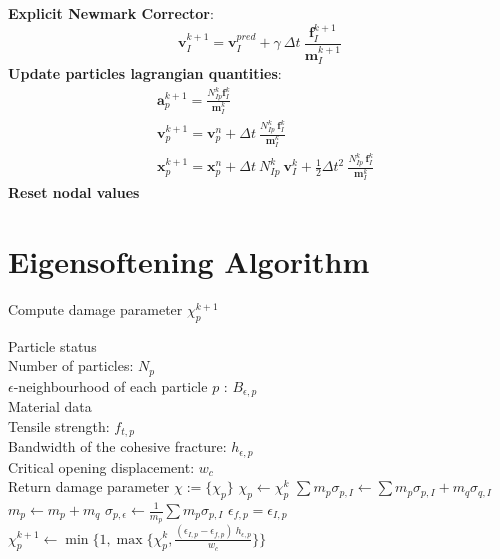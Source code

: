 \message{ !name(2020_EFM_MPM_Eigensoftening.tex)}\documentclass[preprint,12pt,a4paper]{elsarticle}
\newcommand{\vec}[1]{
  \ensuremath{\mathbf{{#1}}}
}
\newcommand{\tens}[1]{
  \ensuremath{\mathbf{{#1}}}
}
\begin{document}
\begin{algorithm}
\begin{algorithmic}[1]
    \STATE \textbf{Explicit Newmark Corrector}:\\
    \begin{equation*}
      \vec{v}_{I}^{k+1} = \vec{v}_{I}^{pred} + \gamma\ \Delta t\ \frac{\vec{f}_{I}^{k+1}}{\tens{m}_I^{k+1}}  
    \end{equation*}
    \STATE \textbf{Update particles lagrangian quantities}:
    \begin{align*}
      &\vec{a}_p^{k+1} = \frac{N_{Ip}^k\vec{f}_{I}^{k}}{\tens{m}_I^k}\\
      &\vec{v}_p^{k+1} = \vec{v}_p^n + \Delta t\
        \frac{N_{Ip}^k\
        \vec{f}_{I}^{k}}{\tens{m}_I^k}\\
      &\vec{x}_p^{k+1} = \vec{x}_p^n + \Delta t\
         N_{Ip}^k\ \vec{v}_{I}^{k} +
        \frac{1}{2}\Delta t^2\ \frac{N_{Ip}^k\
        \vec{f}_{I}^{k}}{\tens{m}_I^k}
    \end{align*}
    \STATE \textbf{Reset nodal values}
  \end{algorithmic}
\end{algorithm} 


\section{Eigensoftening Algorithm}
\label{sec:eigens-algor-1}

\begin{algorithm}
  \caption{Compute damage parameter $\chi_p^{k+1}$}
  \label{alg-eigens}
  \begin{algorithmic}
    \Require Particle status\\
    Number of particles: $N_p$\\
    $\epsilon$-neighbourhood of each particle $p$ : $B_{\epsilon,p}$\\
    \Require Material data\\
    Tensile strength: $f_{t,p}$\\
    Bandwidth of the cohesive fracture: $h_{\epsilon,p}$ \\
    Critical opening displacement: $w_c$\\ 
    \Ensure Return damage parameter $\chi := \{\chi_p\}$
    \State $\chi_p \leftarrow \chi_p^{k}$
    \For{$p$ to $N_p$}
    \For{$q \in B_{\epsilon,p}$}
    \If{$\chi_q < 1$}    
    \State $\sum m_p\sigma_{p,I} \leftarrow \sum m_p\sigma_{p,I} + m_q\sigma_{q,I}$
    \EndIf    
    \State $m_p \leftarrow m_p + m_q$
    \EndFor
    \State $\sigma_{p,\epsilon} \leftarrow \frac{1}{m_p} \sum m_p\sigma_{p,I}$
    \State $\epsilon_{f,p} = \epsilon_{I,p}$   
    \EndIf        
    \Else[$\chi_p \neq 1$ \AND $\epsilon_{f,p} > 0$]
    \State $\chi_p^{k+1} \leftarrow \min\Big \{1 , \max \{\chi_p^{k},
    \frac{(\epsilon_{I,p}- \epsilon_{f,p})\ h_{\epsilon,p}}{w_c} \} \Big \}$    
    \EndIf    
    \EndFor
  \end{algorithmic}
\end{algorithm}

 
\end{document}
